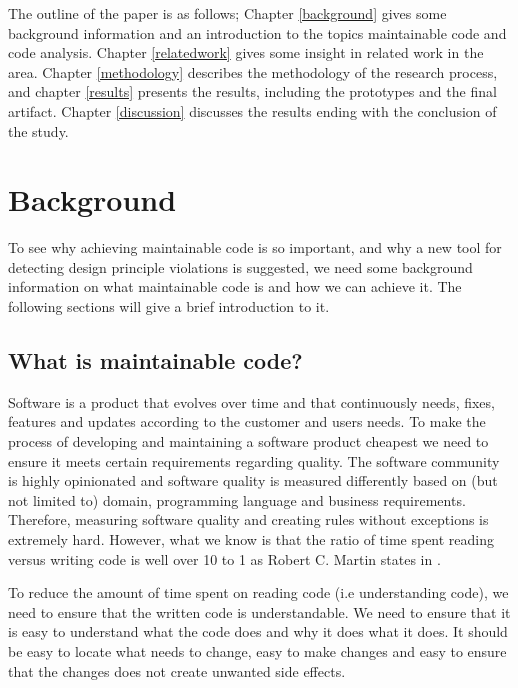 \documentclass{report}
\begin{document}


The outline of the paper is as follows; Chapter \ref{background} gives some background information and an introduction to the topics maintainable code and code analysis. Chapter \ref{relatedwork} gives some insight in related work in the area. Chapter \ref{methodology} describes the methodology of the research process, and chapter \ref{results} presents the results, including the prototypes and the final artifact. Chapter \ref{discussion} discusses the results ending with the conclusion of the study.  

\chapter{Background}
\label{background}
To see why achieving maintainable code is so important, and why a new tool for detecting design principle violations is suggested, we need some background information on what maintainable code is and how we can achieve it. The following sections will give a brief introduction to it.

\section{What is maintainable code?}
Software is a product that evolves over time and that continuously needs, fixes, features and updates according to the customer and users needs. To make the process of developing and maintaining a software product cheapest we need to ensure it meets certain requirements regarding quality. The software community is highly opinionated and software quality is measured differently based on (but not limited to) domain, programming language and business requirements. Therefore, measuring software quality and creating rules without exceptions is extremely hard. However, what we know is that the ratio of time spent reading versus writing code is well over 10 to 1 as Robert C. Martin states in \cite{Martin:2008:CCH:1388398}.

To reduce the amount of time spent on reading code (i.e understanding code), we need to ensure that the written code is understandable. We need to ensure that it is easy to understand what the code does and why it does what it does. It should be easy to locate what needs to change, easy to make changes and easy to ensure that the changes does not create unwanted side effects. \hfill 
\hfill \newline
\end{document}
